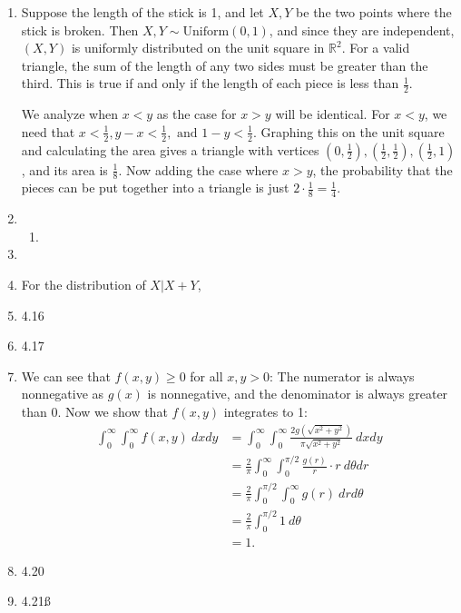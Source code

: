 \documentclass{article}
\begin{document}
\begin{enumerate}
    \item Suppose the length of the stick is 1, and let $X, Y$ be the two points where the stick is 
    broken. Then $X, Y \sim \text{Uniform}(0, 1)$, and since they are independent, $(X, Y)$ is uniformly  
    distributed on the unit square in $\mathbb{R}^2$. For a valid triangle, the sum of the length of any 
    two sides must be greater than the third. This is true if and only if the length of each piece is less 
    than $\frac{1}{2}$. 

    We analyze when $x < y$ as the case for $x > y$ will be identical. For $x < y$, we need that 
    $x < \frac{1}{2}, y - x < \frac{1}{2}, \text{ and } 1 - y < \frac{1}{2}$. Graphing this on the unit 
    square and calculating the area gives a triangle with vertices $(0, \frac{1}{2}), 
    (\frac{1}{2}, \frac{1}{2}), (\frac{1}{2}, 1)$, and its area is $\frac{1}{8}$. Now adding the case where 
    $x > y$, the probability that the pieces can be put together into a triangle is just 
    $2 \cdot \frac{1}{8} = \frac{1}{4}$.

    \item \begin{enumerate}
        \item 
    \end{enumerate}

    \item 

    \item For the distribution of $X|X + Y$, 

    \item 4.16
    
    \item 4.17
    
    \item We can see that $f(x, y) \geq 0$ for all $x, y > 0$: The numerator is always nonnegative as 
    $g(x)$ is nonnegative, and the denominator is always greater than 0. Now we show that $f(x, y)$ 
    integrates to 1: 
    \begin{align*}
        \int_{0}^{\infty} \int_{0}^{\infty} f(x, y) \ dxdy
        &= \int_{0}^{\infty} \int_{0}^{\infty} \frac{2g(\sqrt{x^2 + y^2})}{\pi \sqrt{x^2 + y^2}} \ dxdy \\ 
        &= \frac{2}{\pi} \int_{0}^{\infty} \int_{0}^{\pi / 2} \frac{g(r)}{r} \cdot r \ d\theta dr \\
        &= \frac{2}{\pi} \int_{0}^{\pi / 2} \int_{0}^{\infty} g(r) \ drd\theta \\
        &= \frac{2}{\pi} \int_{0}^{\pi / 2} 1 \ d\theta \\
        &= 1.
    \end{align*}

    
    \item 4.20
    
    \item 4.21ß


\end{enumerate}
\end{document}

